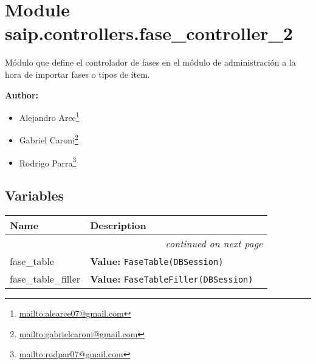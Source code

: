 %
%
%


\section{Module saip.controllers.fase\_controller\_2}

    \label{saip:controllers:fase_controller_2}
Módulo que define el controlador de fases en el módulo de administración a 
la hora de importar fases o tipos de ítem.

\textbf{Author:} \begin{itemize}
\setlength{\parskip}{0.6ex}
  \item Alejandro 
    Arce\footnote{\href{mailto:alearce07@gmail.com}{mailto:alearce07@gmail.com}}

  \item Gabriel 
    Caroni\footnote{\href{mailto:gabrielcaroni@gmail.com}{mailto:gabrielcaroni@gmail.com}}

  \item Rodrigo 
    Parra\footnote{\href{mailto:rodpar07@gmail.com}{mailto:rodpar07@gmail.com}}

\end{itemize}





  \subsection{Variables}

    \vspace{-1cm}
\hspace{\varindent}\begin{longtable}{|p{\varnamewidth}|p{\vardescrwidth}|l}
\cline{1-2}
\cline{1-2} \centering \textbf{Name} & \centering \textbf{Description}& \\
\cline{1-2}
\endhead\cline{1-2}\multicolumn{3}{r}{\small\textit{continued on next page}}\\\endfoot\cline{1-2}
\endlastfoot\raggedright f\-a\-s\-e\-\_\-t\-a\-b\-l\-e\- & \raggedright \textbf{Value:} 
{\tt FaseTable(DBSession)}&\\
\cline{1-2}
\raggedright f\-a\-s\-e\-\_\-t\-a\-b\-l\-e\-\_\-f\-i\-l\-l\-e\-r\- & \raggedright \textbf{Value:} 
{\tt FaseTableFiller(DBSession)}&\\
\cline{1-2}
\end{longtable}


